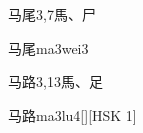 \begin{entry}{马尾}{3,7}{⾺、⼫}
  \begin{phonetics}{马尾}{ma3wei3}
  \end{phonetics}
\end{entry}

\begin{entry}{马路}{3,13}{⾺、⾜}
  \begin{phonetics}{马路}{ma3lu4}[][HSK 1]
  \end{phonetics}
\end{entry}


